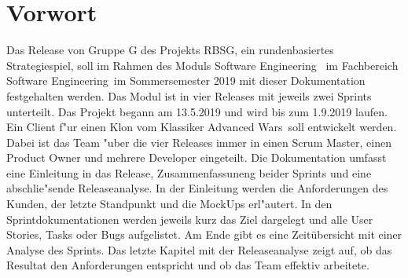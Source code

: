 \documentclass[12pt, titlepage]{scrartcl}
\newcommand{\RN}[1]{%
	\textup{\uppercase\expandafter{\romannumeral#1}}%
}
\begin{document}
	\section{Vorwort}
    	Das Release \RN{3} von Gruppe G des Projekts RBSG, ein rundenbasiertes Strategiespiel, soll im Rahmen des Moduls \glqq Software Engineering \RN{1}\grqq\ im Fachbereich \glqq Software Engineering\grqq\ im Sommersemester 2019 mit dieser Dokumentation festgehalten werden.
    	\vspace{0.3cm} \newline
        Das Modul ist in vier Releases mit jeweils zwei Sprints unterteilt. Das Projekt begann am 13.5.2019 und wird bis zum 1.9.2019 laufen. Ein Client f"ur einen Klon vom Klassiker \glqq Advanced Wars\grqq\ soll entwickelt werden. Dabei ist das Team "uber die vier Releases immer in einen Scrum Master, einen Product Owner und mehrere Developer eingeteilt.
        \vspace{0.3cm} \newline
        Die Dokumentation umfasst eine Einleitung in das Release, Zusammenfassuneng beider Sprints und eine abschlie"sende Releaseanalyse. In der Einleitung werden die Anforderungen des Kunden, der letzte Standpunkt und die MockUps erl"autert. In den Sprintdokumentationen werden jeweils kurz das Ziel dargelegt und alle User Stories, Tasks oder Bugs aufgelistet. Am Ende gibt es eine Zeit\"ubersicht mit einer Analyse des Sprints. Das letzte Kapitel mit der Releaseanalyse zeigt auf, ob das Resultat den Anforderungen entspricht und ob das Team effektiv arbeitete.
    \newpage
    \tableofcontents
    \newpage
\end{document}
